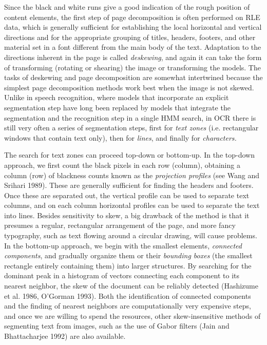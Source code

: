 \medskip\noindent Since the black and white runs give a good indication of the
rough position of content elements, the first step of page decomposition is
often performed on RLE data, which is generally sufficient for establishing
the local horizontal and vertical directions and for the appropriate grouping
of titles, headers, footers, and other material set in a font different from
the main body of the text. Adaptation to the directions inherent in the page
is called {\it deskewing}, and again it can take the form of transforming
(rotating or shearing) the image or transforming the models.  The tasks of
deskewing and page decomposition are somewhat intertwined because the simplest
page decomposition methods work best when the image is not skewed.  Unlike in
speech recognition, where models that incorporate an explicit segmentation
step have long been replaced by models that integrate the segmentation and the
recognition step in a single HMM search, in OCR there is still very often a
series of segmentation steps, first for {\it text zones} (i.e. rectangular
windows that contain text only), then for {\it lines}, and finally for {\it
  characters.}

The search for text zones can proceed top-down or bottom-up.  In the top-down
approach, we first count the black pixels in each row (column), obtaining a
column (row) of blackness counts known as the {\it projection profiles} (see
Wang and Srihari 1989)\nocite{Wang:1989}. These are
generally sufficient for finding the headers and footers. Once these are
separated out, the vertical profile can be used to separate text columns, and
on each column horizontal profiles can be used to separate the text into lines.
Besides sensitivity to skew, a big drawback of the method is that it presumes
a regular, rectangular arrangement of the page, and more fancy typography,
such as text flowing around a circular drawing, will cause problems.  In the
bottom-up approach, we begin with the smallest elements, {\it connected
  components}, and gradually organize them or
their {\it bounding boxes} (the smallest rectangle
entirely containing them) into larger structures. By searching for the dominant
peak in a histogram of vectors connecting each component to its nearest
neighbor, the skew of the document can be reliably detected (Hashizume et al.
1986, O'Gorman 1993).\nocite{Hashizume:1986}\nocite{OGorman:1993} Both the
identification of connected components and the finding of nearest neighbors
are computationally very expensive steps, and once we are willing to spend the
resources, other skew-insensitive methods of segmenting text from images, such
as the use of Gabor filters (Jain and Bhattacharjee 1992) are also available.
\nocite{Jain:1992} 

